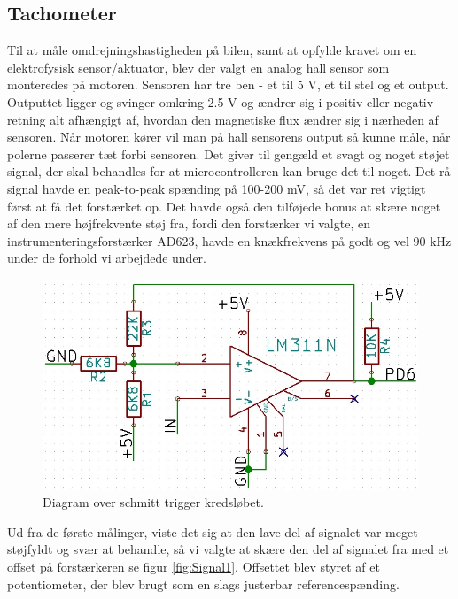 \subsection{Tachometer}

Til at måle omdrejningshastigheden på bilen, samt at opfylde kravet om en elektrofysisk sensor/aktuator, blev der valgt en analog hall sensor som monteredes på motoren. Sensoren har tre ben - et til 5 V, et til stel og et output. Outputtet ligger og svinger omkring 2.5 V og ændrer sig i positiv eller negativ retning alt afhængigt af, hvordan den magnetiske flux ændrer sig i nærheden af sensoren. Når motoren kører vil man på hall sensorens output så kunne måle, når polerne passerer tæt forbi sensoren. Det giver til gengæld et svagt og noget støjet signal, der skal behandles for at microcontrolleren kan bruge det til noget. Det rå signal havde en peak-to-peak spænding på 100-200 mV, så det var ret vigtigt først at få det forstærket op. Det havde også den tilføjede bonus at skære noget af den mere højfrekvente støj fra, fordi den forstærker vi valgte, en instrumenteringsforstærker AD623, havde en knækfrekvens på godt og vel 90 kHz under de forhold vi arbejdede under. 

\begin{figure}[h]

	\centering
		\includegraphics[scale=0.3]{Billeder/Schmitt.jpg}
	\caption{Diagram over schmitt trigger kredsløbet.}
	\label{fig:Schmitt}
	
\end{figure}

Ud fra de første målinger, viste det sig at den lave del af signalet var meget støjfyldt og svær at behandle, så vi valgte at skære den del af signalet fra med et offset på forstærkeren se figur \ref{fig:Signal1}. Offsettet blev styret af et potentiometer, der blev brugt som en slags justerbar referencespænding.

